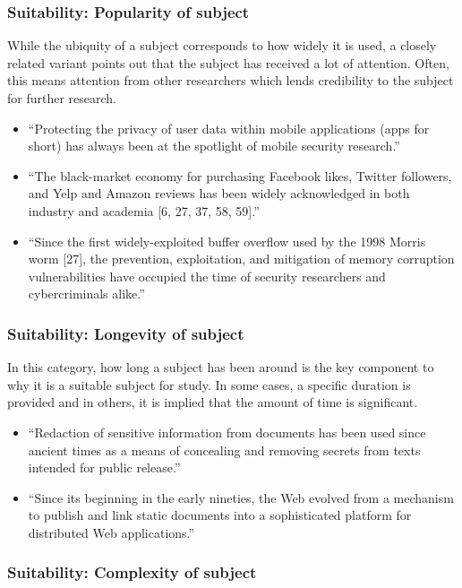 \documentclass[sigconf,anonymous]{acmart}
\begin{document}
	
	\subsubsection{Suitability: Popularity of subject}
	
	While the ubiquity of a subject corresponds to how widely it is used, a closely related variant points out that the subject has received a lot of attention. Often, this means attention from other researchers which lends credibility to the subject for further research.
	\begin{itemize}
		\item	``Protecting the privacy of user data within mobile applications (apps for short) has always been at the spotlight of mobile security research.''
		
		\item	``The black-market economy for purchasing Facebook likes, Twitter followers, and Yelp and Amazon reviews has been widely acknowledged in both industry and academia [6, 27, 37, 58, 59].''
		
		\item	``Since the first widely-exploited buffer overflow used by the 1998 Morris worm [27], the prevention, exploitation, and mitigation of memory corruption vulnerabilities have occupied the time of security researchers and cybercriminals alike.''
	\end{itemize}
	\subsubsection{Suitability: Longevity of subject }
	
	In this category, how long a subject has been around is the key component to why it is a suitable subject for study. In some cases, a specific duration is provided and in others, it is implied that the amount of time is significant.
	\begin{itemize}
		\item ``Redaction of sensitive information from documents has been used since ancient times as a means of concealing and removing secrets from texts intended for public release.''
		
		\item	``Since its beginning in the early nineties, the Web evolved from a mechanism to publish and link static documents into a sophisticated platform for distributed Web applications.''
	\end{itemize}
	
	
	\subsubsection{Suitability: Complexity of subject}
	
\end{document}
